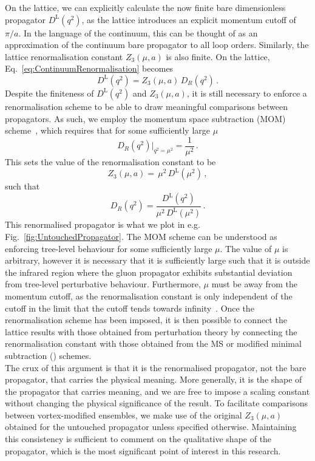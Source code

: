On the lattice, we can explicitly calculate the now finite bare dimensionless propagator $D^\text{L}(q^2)$, as the lattice introduces an explicit momentum cutoff of $\pi/a$. In the language of the continuum, this can be thought of as an approximation of the continuum bare propagator to all loop orders. Similarly, the lattice renormalisation constant $Z_3(\mu, a)$ is also finite. On the lattice, Eq.~\eqref{eq:ContinuumRenormalisation} becomes
%
\begin{equation}
D^\text{L}(q^2) = Z_3(\mu, a)\, D_R(q^2)\, .
\label{eq:LatticeRenormalisation}
\end{equation}
%
Despite the finiteness of $D^\text{L}(q^2)$ and $Z_3(\mu, a)$, it is still necessary to enforce a renormalisation scheme to be able to draw meaningful comparisons between propagators. As such, we employ the momentum space subtraction (MOM) scheme~\cite{Bowman:2004jm,Leinweber:1998uu,Bonnet:2001uh}, which requires that for some sufficiently large $\mu$
%
\begin{equation}
D_R(q^2)\big|_{q^2=\mu^2}=\frac{1}{\mu^2}\, .
\end{equation}
%
This sets the value of the renormalisation constant to be
%
\begin{equation}
Z_3(\mu,a) = \, \mu^2 \, D^\text{L}(\mu^2)\, ,
\end{equation}
such that
%
\begin{equation}
D_R(q^2) = \frac{D^\text{L}(q^2)}{\mu^2 \, D^\text{L}(\mu^2)}\, .
\end{equation}
%
This renormalised propagator is what we plot in e.g. Fig.~\ref{fig:UntouchedPropagator}. The MOM scheme can be understood as enforcing tree-level behaviour for some sufficiently large $\mu$. The value of $\mu$ is arbitrary, however it is necessary that it is sufficiently large such that it is outside the infrared region where the gluon propagator exhibits substantial deviation from tree-level perturbative behaviour. Furthermore, $\mu$ must be away from the momentum cutoff, as the renormalisation constant is only independent of the cutoff in the limit that the cutoff tends towards infinity~\cite{Bonnet:2001uh,Boucaud:2006pc}.  Once the renormalisation scheme has been imposed, it is then possible to connect the lattice results with those obtained from perturbation theory by connecting the renormalisation constant with those obtained from the MS or modified minimal subtraction () schemes.\\
 
The crux of this argument is that it is the renormalised propagator, not the bare propagator, that carries the physical meaning.  More generally, it is the shape of the propagator that carries meaning, and we are free to impose a scaling constant without changing the physical significance of the result. To facilitate comparisons between vortex-modified ensembles, we make use of the original $Z_3(\mu, a)$ obtained for the untouched propagator unless specified otherwise. Maintaining this consistency is sufficient to comment on the qualitative shape of the propagator, which is the most significant point of interest in this research.\\

